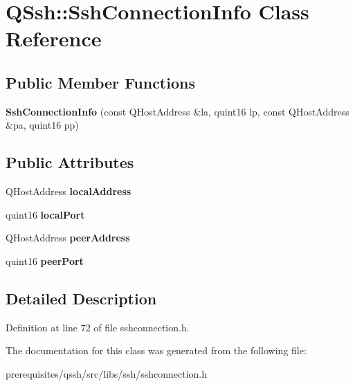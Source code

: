 \hypertarget{class_q_ssh_1_1_ssh_connection_info}{}\section{Q\+Ssh\+:\+:Ssh\+Connection\+Info Class Reference}
\label{class_q_ssh_1_1_ssh_connection_info}
\subsection*{Public Member Functions}
\begin{DoxyCompactItemize}
\item 
\mbox{\label{class_q_ssh_1_1_ssh_connection_info_ae2e63af143ba37eae913c1bed728c8b3}} 
{\bfseries Ssh\+Connection\+Info} (const Q\+Host\+Address \&la, quint16 lp, const Q\+Host\+Address \&pa, quint16 pp)
\end{DoxyCompactItemize}
\subsection*{Public Attributes}
\begin{DoxyCompactItemize}
\item 
\mbox{\label{class_q_ssh_1_1_ssh_connection_info_a1f53bc608e57484d6931293726e8a1d7}} 
Q\+Host\+Address {\bfseries local\+Address}
\item 
\mbox{\label{class_q_ssh_1_1_ssh_connection_info_a7857fde87fa2c98a22eb92f00b8eb0d3}} 
quint16 {\bfseries local\+Port}
\item 
\mbox{\label{class_q_ssh_1_1_ssh_connection_info_a445e31fd3b719769dbcb182819d006af}} 
Q\+Host\+Address {\bfseries peer\+Address}
\item 
\mbox{\label{class_q_ssh_1_1_ssh_connection_info_ac00ed32f1cdf1b79d550d0887176a718}} 
quint16 {\bfseries peer\+Port}
\end{DoxyCompactItemize}


\subsection{Detailed Description}


Definition at line 72 of file sshconnection.\+h.



The documentation for this class was generated from the following file\+:\begin{DoxyCompactItemize}
\item 
prerequisites/qssh/src/libs/ssh/sshconnection.\+h\end{DoxyCompactItemize}
